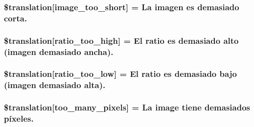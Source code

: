 \subsubsection[{\$translation}]{\setlength{\rightskip}{0pt plus 5cm}\$translation\mbox{[}\textquotesingle{}image\+\_\+too\+\_\+short\textquotesingle{}\mbox{]} = \textquotesingle{}La imagen es demasiado corta.\textquotesingle{}}\label{class_8upload_8es___e_s_8php_a86fcd4e1157b00032df451188d735527}
\hypertarget{class_8upload_8es___e_s_8php_a23396f6ce7f31e5e5f1b57580621d982}{}
\subsubsection[{\$translation}]{\setlength{\rightskip}{0pt plus 5cm}\$translation\mbox{[}\textquotesingle{}ratio\+\_\+too\+\_\+high\textquotesingle{}\mbox{]} = \textquotesingle{}El ratio es demasiado alto (imagen demasiado ancha).\textquotesingle{}}\label{class_8upload_8es___e_s_8php_a23396f6ce7f31e5e5f1b57580621d982}
\hypertarget{class_8upload_8es___e_s_8php_ac533b9a479f056b0b8623e4268f068c2}{}
\subsubsection[{\$translation}]{\setlength{\rightskip}{0pt plus 5cm}\$translation\mbox{[}\textquotesingle{}ratio\+\_\+too\+\_\+low\textquotesingle{}\mbox{]} = \textquotesingle{}El ratio es demasiado bajo (imagen demasiado alta).\textquotesingle{}}\label{class_8upload_8es___e_s_8php_ac533b9a479f056b0b8623e4268f068c2}
\hypertarget{class_8upload_8es___e_s_8php_aa4051ef64e94a3f8295c63cf85544016}{}
\subsubsection[{\$translation}]{\setlength{\rightskip}{0pt plus 5cm}\$translation\mbox{[}\textquotesingle{}too\+\_\+many\+\_\+pixels\textquotesingle{}\mbox{]} = \textquotesingle{}La image tiene demasiados píxeles.\textquotesingle{}}\label{class_8upload_8es___e_s_8php_aa4051ef64e94a3f8295c63cf85544016}
\hypertarget{class_8upload_8es___e_s_8php_a1fe342c27ce61f4ff4e0120ba647033e}{}

